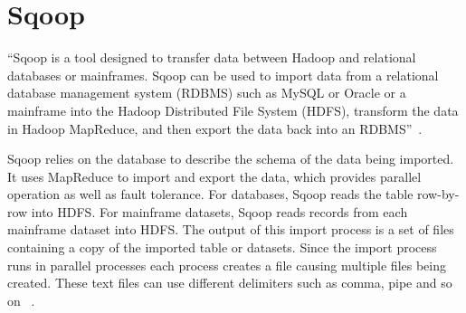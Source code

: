 \section{Sqoop}

``Sqoop is a tool designed to transfer data between Hadoop and 
relational databases or mainframes. Sqoop can be used to import 
data from a relational database management system (RDBMS) such 
as MySQL or Oracle or a mainframe into the Hadoop Distributed 
File System (HDFS), transform the data in Hadoop MapReduce, and 
then export the data back into an RDBMS''~\cite{hid-sp18-517-Sqoop}.

Sqoop relies on the database to describe the schema of the data 
being imported. It uses MapReduce to import and export the data, 
which provides parallel operation as well as fault tolerance. 
For databases, Sqoop reads the table row-by-row into HDFS. 
For mainframe datasets, Sqoop reads records from each mainframe 
dataset into HDFS. The output of this import process is a set of 
files containing a copy of the imported table or datasets. Since 
the import process runs in parallel processes each process 
creates a file causing multiple files being created. These text 
files can use different delimiters such as comma, pipe and so on 
~\cite{hid-sp18-517-Sqoop}.


